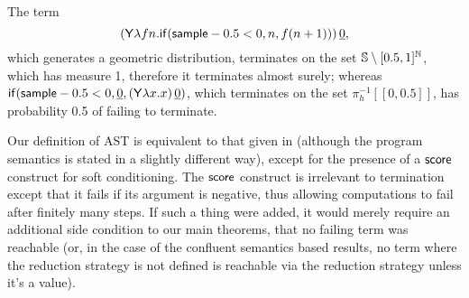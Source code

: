 \iffalse
\lo{Alternatively, define the \emph{runtime of $M$} to be the random variable 
\[
T_M(s) := 
\begin{cases}
\min \set{n \mid \pi_0(\red^n(M, s)) \textrm{ is a value}} & \hbox{if $\red^\infty(M,s)$ is defined}\\
\infty & \hbox{otherwise}
\end{cases}
\]
Equivalently, we say that $M$ is \emph{almost surely terminating} (AST) if $T_M < \infty$ a.s.; 
and $M$ is \emph{positively almost surely terminating} (PAST) if $\expect{T_M} < \infty$.}
\fi
\begin{example} The term 
\[
(\mathsf{Y} \lambda f n. \mathsf{if}(\mathsf{sample} - 0.5 < 0, n, f (n+1)) ) \, \underline{0},
\] 
which generates a geometric distribution, terminates on the set ${\mathbb{S}} \setminus [0.5,1]^\mathbb N$, which has measure 1, therefore it terminates almost surely; whereas 
\(
\mathsf{if}(\mathsf{sample} - 0.5 < 0, \underline 0, (\mathsf{Y} \lambda x. x) \, \underline 0)
\), 
which terminates on the set $\pi_h^{-1}[[0,0.5]]$, has probability 0.5 of failing to terminate.
\end{example}

\begin{remark}
\label{rem:score}
Our definition of AST is equivalent to that given in \cite{DBLP:conf/esop/MakOPW21} (although the program semantics is stated in a slightly different way), except for the presence of a $\tscore$ construct for soft conditioning. 
The $\tscore$ construct is irrelevant to termination except that it fails if its argument is negative, thus allowing computations to fail after finitely many steps. 
If such a thing were added, it would merely require an additional side condition to our main theorems, that no failing term was reachable (or, in the case of the confluent semantics based results, no term where the reduction strategy is not defined is reachable via the reduction strategy unless it's a value).
\end{remark}

\iffalse
\lo{Your operational semantics does not maintain a record of the current weight of the reduction.
A.s.~termination does depend on $\tscore$: see \cite[\S 4.3]{DBLP:conf/esop/MakOPW21}\footnote{\url{https://arxiv.org/abs/2004.03924}}.
I think it important to take the behaviour of $\tscore$ into account;
you should do it as a future task.}
\fi
